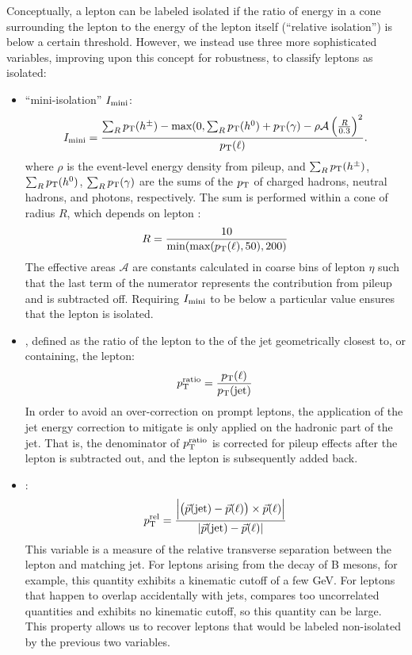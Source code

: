 Conceptually, a lepton can be labeled isolated if the ratio of 
energy in a cone surrounding the lepton to the energy of the lepton itself
(``relative isolation'') is below a certain threshold.
However, we instead use three more sophisticated variables, improving upon this concept for robustness,
to classify leptons as isolated:
\begin{itemize}
    \item ``mini-isolation'' $I_\mathrm{mini}$: 
    \begin{equation}
        I_\mathrm{mini} = \frac{\sum_R p_{\mathrm{T}}(h^\pm) - \mbox{max}(0, \sum_R p_{\mathrm{T}}(h^0)+p_{\mathrm{T}}(\gamma) - \rho\mathcal{A}\left(\frac{R}{0.3}\right)^2}{p_{\mathrm{T}}(\ell)}.
    \end{equation}
    where $\rho$ is the event-level energy density from pileup,
    and $\sum_Rp_{\mathrm{T}}(h^\pm)$, $\sum_Rp_{\mathrm{T}}(h^0)$, $\sum_Rp_{\mathrm{T}}(\gamma)$ 
    are the sums of the $p_{\mathrm{T}}$ of charged hadrons, neutral hadrons, and photons, respectively.
    The sum is performed within a cone of radius $R$, which depends on lepton \pt:
    \begin{equation}
        R = \frac{10}{\mbox{min}(\mbox{max}(p_{\mathrm{T}}(\ell), 50), 200)}
    \end{equation}
    The effective areas $\mathcal{A}$ are constants calculated in coarse bins of
    lepton $\eta$ such that the last term of the numerator represents the
    contribution from pileup and is subtracted off.
    Requiring $I_\mathrm{mini}$ to be below a particular value ensures that the
    lepton is isolated.

    \item \ptratio, defined as the ratio of the lepton \pt to the
    \pt of the jet geometrically closest to, or containing, the lepton:
    \begin{equation}
        p_{\mathrm{T}}^\text{ratio} = \frac{p_{\mathrm{T}}(\ell)}{p_{\mathrm{T}}(\text{jet})}
    \end{equation}
    In order to avoid an
    over-correction on prompt leptons, the application of the jet energy
    correction to mitigate is only applied on the hadronic part of the jet.
    That is, the denominator of $p_{\mathrm{T}}^\text{ratio}$ is corrected for pileup effects
    after the lepton is subtracted out, and the lepton is subsequently added back.

    \item \ptrel:
    \begin{equation}
        p_{\mathrm{T}}^\text{rel}=\frac{\left|\left(\vec{p}(\text{jet})-\vec{p}(\ell)\right) 
        \times \vec{p}(\ell)\right| }{|\vec{p}(\text{jet})-\vec{p}(\ell)|}
    \end{equation}
    This variable is a measure of the relative transverse separation between the lepton 
    and matching jet. For leptons arising from the decay of B mesons, for example,
    this quantity exhibits a kinematic cutoff of a few GeV. For leptons that
    happen to overlap accidentally with jets, \ptrel compares too uncorrelated
    quantities and exhibits no kinematic cutoff, so this quantity can be large.
    This property allows us to recover leptons that would be labeled non-isolated
    by the previous two variables.
\end{itemize}

